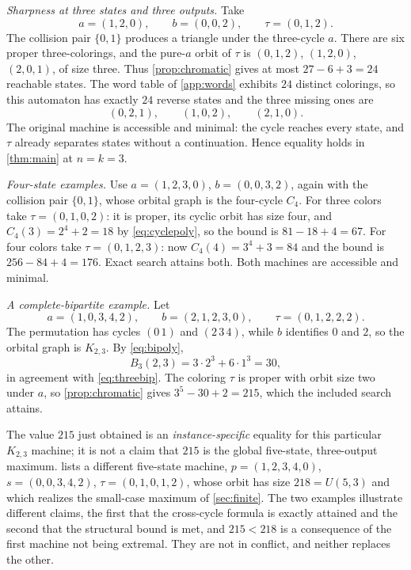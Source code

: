 \documentclass[11pt,a4paper]{article}
\numberwithin{equation}{section}
\theoremstyle{definition}
\theoremstyle{remark}
\begin{document}
\smallskip
\noindent\emph{Sharpness at three states and three outputs.} Take
\begin{equation}\label{eq:n3}
 a=(1,2,0),\qquad b=(0,0,2),\qquad\tau=(0,1,2).
\end{equation}
The collision pair $\{0,1\}$ produces a triangle under the three-cycle $a$.
There are six proper three-colorings, and the pure-$a$ orbit of $\tau$ is
$(0,1,2)$, $(1,2,0)$, $(2,0,1)$, of size three. Thus
\cref{prop:chromatic} gives at most $27-6+3=24$ reachable states. The word
table of \cref{app:words} exhibits $24$ distinct colorings, so this automaton
has exactly $24$ reverse states and the three missing ones are
\[
 (0,2,1),\qquad(1,0,2),\qquad(2,1,0).
\]
The original machine is accessible and minimal: the cycle reaches every
state, and $\tau$ already separates states without a continuation. Hence
equality holds in \cref{thm:main} at $n=k=3$.

\smallskip
\noindent\emph{Four-state examples.} Use $a=(1,2,3,0)$, $b=(0,0,3,2)$, again
with the collision pair $\{0,1\}$, whose orbital graph is the four-cycle
$C_4$. For three colors take $\tau=(0,1,0,2)$: it is proper, its cyclic orbit
has size four, and $C_4(3)=2^4+2=18$ by \eqref{eq:cyclepoly}, so the bound is
$81-18+4=67$. For four colors take $\tau=(0,1,2,3)$: now $C_4(4)=3^4+3=84$
and the bound is $256-84+4=176$. Exact search attains both. Both machines are
accessible and minimal.

\smallskip
\noindent\emph{A complete-bipartite example.} Let
\[
 a=(1,0,3,4,2),\qquad b=(2,1,2,3,0),\qquad\tau=(0,1,2,2,2).
\]
The permutation has cycles $(0\,1)$ and $(2\,3\,4)$, while $b$ identifies $0$
and $2$, so the orbital graph is $K_{2,3}$. By \eqref{eq:bipoly},
\[
 B_3(2,3)=3\cdot2^3+6\cdot1^3=30,
\]
in agreement with \eqref{eq:threebip}. The coloring $\tau$ is proper with
orbit size two under $a$, so \cref{prop:chromatic} gives $3^5-30+2=215$,
which the included search attains.

\begin{remark}[Two different $n=5$, $k=3$ examples]\label{rem:twofives}
The value $215$ just obtained is an \emph{instance-specific} equality for
this particular $K_{2,3}$ machine; it is not a claim that $215$ is the global
five-state, three-output maximum.  lists a different
five-state machine, $p=(1,2,3,4,0)$, $s=(0,0,3,4,2)$, $\tau=(0,1,0,1,2)$,
whose orbit has size $218=U(5,3)$ and which realizes the small-case maximum
of \cref{sec:finite}. The two examples illustrate different claims, the first
that the cross-cycle formula is exactly attained and the second that the
structural bound is met, and $215<218$ is a consequence of the first machine
not being extremal. They are not in conflict, and neither replaces the other.
\end{remark}
\end{document}
